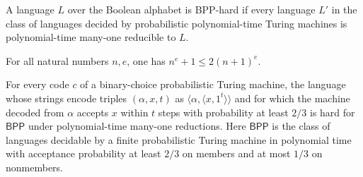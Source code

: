 \begin{definition}
\label{Randomized.BPPHard}
\leanok
{}
A language $L$ over the Boolean alphabet is BPP-hard if every language $L'$ in the class
of languages decided by probabilistic polynomial-time Turing machines is polynomial-time
many-one reducible to $L$.
\end{definition}

\begin{theorem}
\label{Randomized.pow_add_one_le_two_mul}
\leanok
{}
For all natural numbers $n,e$, one has $n^e+1\le 2(n+1)^e$.
\end{theorem}

\begin{theorem}
\label{Randomized.probAccept_bppHard}
\leanok
{}
For every code $c$ of a binary-choice probabilistic Turing machine, the language whose
strings encode triples $(\alpha,x,t)$ as $\langle\alpha,\langle x,1^t\rangle\rangle$ and
for which the machine decoded from $\alpha$ accepts $x$ within $t$ steps with
probability at least $2/3$ is hard for $\mathsf{BPP}$ under polynomial-time many-one
reductions. Here $\mathsf{BPP}$ is the class of languages decidable by a finite
probabilistic Turing machine in polynomial time with acceptance probability at least
$2/3$ on members and at most $1/3$ on nonmembers.
\end{theorem}
